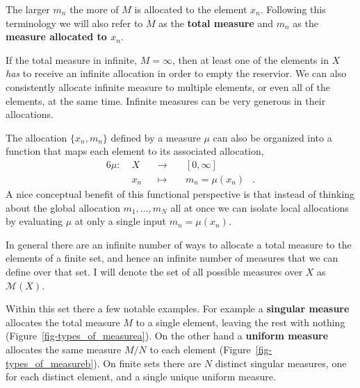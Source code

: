 \documentclass[
  letterpaper,
  DIV=11,
  numbers=noendperiod]{scrartcl}
\begin{document}
The larger \(m_{n}\) the more of \(M\) is allocated to the element
\(x_{n}\). Following this terminology we will also refer to \(M\) as the
\textbf{total measure} and \(m_{n}\) as the \textbf{measure allocated to
\(x_{n}\)}.

If the total measure in infinite, \(M = \infty\), then at least one of
the elements in \(X\) \emph{has} to receive an infinite allocation in
order to empty the reservior. We can also consistently allocate infinite
measure to multiple elements, or even all of the elements, at the same
time. Infinite measures can be very generous in their allocations.

The allocation \(\{ x_{n}, m_{n} \}\) defined by a measure \(\mu\) can
also be organized into a function that maps each element to its
associated allocation, \begin{alignat*}{6}
\mu :\; & X & &\rightarrow& \; & [0, \infty] &
\\
& x_{n} & &\mapsto& & m_{n} = \mu(x_{n}) &.
\end{alignat*} A nice conceptual benefit of this functional perspective
is that instead of thinking about the global allocation
\(m_1, \ldots, m_N\) all at once we can isolate local allocations by
evaluating \(\mu\) at only a single input \(m_{n} = \mu(x_{n})\).

In general there are an infinite number of ways to allocate a total
measure to the elements of a finite set, and hence an infinite number of
measures that we can define over that set. I will denote the set of all
possible measures over \(X\) as \(\mathcal{M}(X)\).

Within this set there a few notable examples. For example a
\textbf{singular measure} allocates the total measure \(M\) to a single
element, leaving the rest with nothing
(Figure~\ref{fig-types_of_measurea}). On the other hand a
\textbf{uniform measure} allocates the same measure \(M / N\) to each
element (Figure~\ref{fig-types_of_measureb}). On finite sets there are
\(N\) distinct singular measures, one for each distinct element, and a
single unique uniform measure.
\end{document}
